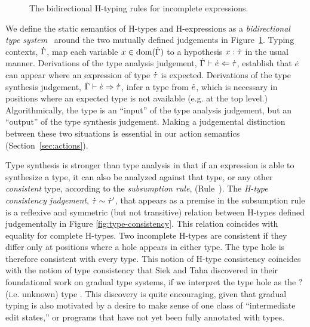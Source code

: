 \begin{figure}
\caption{The bidirectional H-typing rules for incomplete expressions.\label{fig:ana-synth}}
\end{figure}
We define the static semantics of H-types and H-expressions as a \emph{bidirectional type
  system}~\cite{Pierce:2000:LTI:345099.345100,DBLP:conf/icfp/DaviesP00,DBLP:conf/tldi/ChlipalaPH05,bidi-tutorial}
around the two mutually defined judgements in Figure~\ref{fig:ana-synth}. Typing contexts, $\dot{\Gamma}$, map each variable $x \in
\text{dom}(\dot{\Gamma})$ to a hypothesis $x : \dot{\tau}$ in the usual manner. 
%
Derivations of the type analysis judgement, $\dot{\Gamma} \vdash \dot{e} \Leftarrow \dot{\tau}$,
establish that $\dot{e}$ can appear where an expression of type $\dot{\tau}$ is
expected. Derivations of the type synthesis judgement,
$\dot{\Gamma} \vdash \dot{e} \Rightarrow \dot{\tau}$, infer a type from $\dot{e}$, which is
necessary in positions where an expected type is not available (e.g. at the
top level.) Algorithmically, the type is an ``input'' of the type analysis
judgement, but an ``output'' of the type synthesis judgement.  Making a
judgemental distinction between these two situations is essential in our
action semantics (Section~\ref{sec:actions}).

Type synthesis is stronger than type analysis in that if an expression is
able to synthesize a type, it can also be analyzed against that type, or
any other \emph{consistent} type, according to the \emph{subsumption rule},
(Rule~).
The \emph{H-type consistency judgement}, $\dot{\tau} \sim \dot{\tau}'$, that
appears as a premise in the subsumption rule is a reflexive and symmetric
(but not transitive) relation between H-types defined judgementally in
Figure \ref{fig:type-consistency}. This relation coincides with equality
for complete H-types. Two incomplete H-types are consistent if they differ
only at positions where a hole appears in either type. The type hole is
therefore consistent with every type. This notion of H-type consistency
coincides with the notion of type consistency that Siek and Taha discovered
in their foundational work on gradual type systems, if we interpret the
type hole as the $?$ (i.e. unknown) type \cite{Siek06a}. This discovery is quite encouraging, given that gradual typing is also motivated by a 
desire to make sense of one class of ``intermediate edit states,'' or programs that
have not yet been fully annotated with types.

